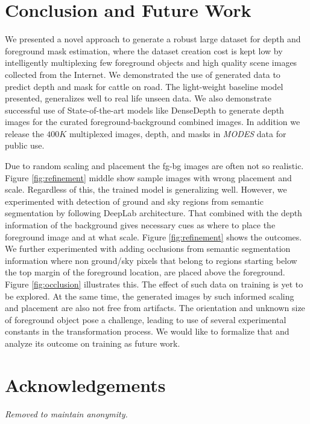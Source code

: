\documentclass[review]{cvpr}
\begin{document}
\section{Conclusion and Future Work}

We presented a novel approach to generate a robust large dataset for depth and foreground mask estimation, where the dataset creation cost is kept low by intelligently multiplexing few foreground objects and high quality scene images collected from the Internet. We demonstrated the use of generated data to predict depth and mask for cattle on road. The light-weight baseline model presented, generalizes well to real life unseen data.  We also demonstrate successful use of State-of-the-art models like DenseDepth to generate depth images for the curated foreground-background combined images. In addition we release the $400K$ multiplexed images, depth, and masks in \textit{MODES} data for public use.

Due to random scaling and placement the fg-bg images are often not so realistic. Figure \ref{fig:refinement} middle show sample images with wrong placement and scale. Regardless of this, the trained model is generalizing well. However, we experimented with detection of ground and sky regions from semantic segmentation by following DeepLab architecture\cite{deeplabv3plus2018}. That combined with the depth information of the background gives necessary cues as where to place the foreground image and at what scale. Figure \ref{fig:refinement} shows the outcomes. We further experimented with adding occlusions from semantic segmentation information where non ground/sky pixels that belong to regions starting below the top margin of the foreground location, are placed above the foreground. Figure \ref{fig:occlusion} illustrates this. The effect of such data on training is yet to be explored. At the same time, the generated images by such informed scaling and placement are also not free from artifacts. The orientation and unknown size of foreground object pose a challenge, leading to use of several experimental constants in the transformation process. We would like to formalize that and analyze its outcome on training as future work.

\section{Acknowledgements}
\textit{Removed to maintain anonymity.}

{\small


}
\end{document}
